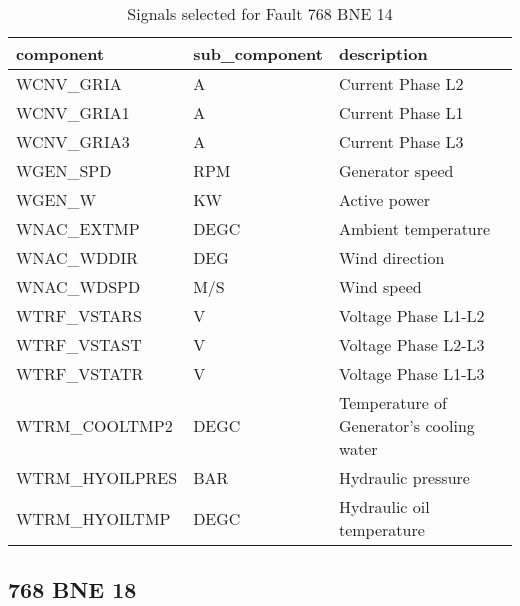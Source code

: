 \begin{table}[!ht]
    \centering
    \begin{tabular}{|l|l|l|}
    \hline
        component & sub\_component & description \\ \hline
        WCNV\_GRIA & A & Current Phase L2 \\ \hline
        WCNV\_GRIA1 & A & Current Phase L1 \\ \hline
        WCNV\_GRIA3 & A & Current Phase L3 \\ \hline
        WGEN\_SPD & RPM & Generator speed \\ \hline
        WGEN\_W & KW & Active power \\ \hline
        WNAC\_EXTMP & DEGC & Ambient temperature \\ \hline
        WNAC\_WDDIR & DEG & Wind direction \\ \hline
        WNAC\_WDSPD & M/S & Wind speed \\ \hline
        WTRF\_VSTARS & V & Voltage Phase L1-L2 \\ \hline
        WTRF\_VSTAST & V & Voltage Phase L2-L3 \\ \hline
        WTRF\_VSTATR & V & Voltage Phase L1-L3 \\ \hline
        WTRM\_COOLTMP2 & DEGC & Temperature of Generator's cooling water \\ \hline
        WTRM\_HYOILPRES & BAR & Hydraulic pressure \\ \hline
        WTRM\_HYOILTMP & DEGC & Hydraulic oil temperature \\ \hline
    \end{tabular}
    \caption{Signals selected for Fault 768 BNE 14}
\end{table}

\subsection{768 BNE 18}

